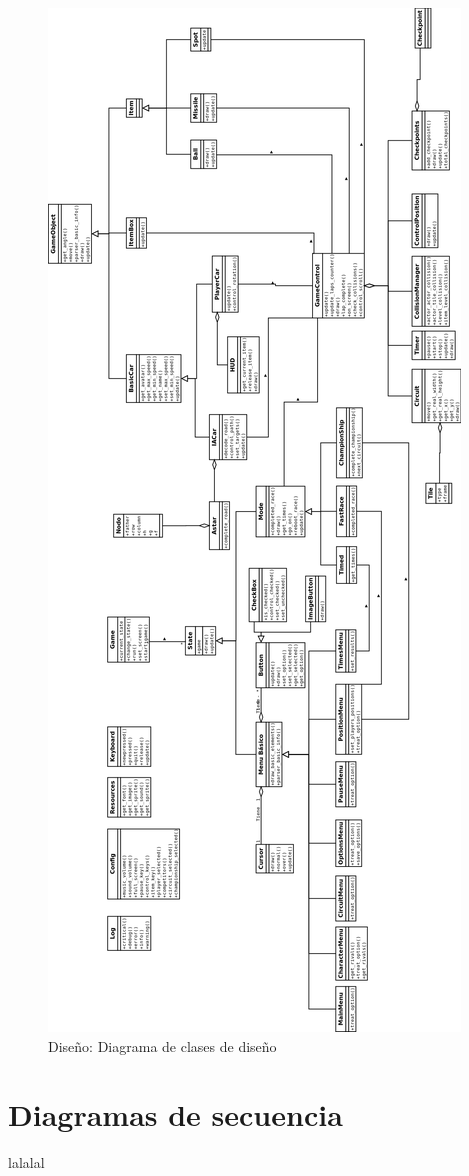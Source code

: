 \begin{figure}[H]
  \label{diagrama_clases_diseno}
  \begin{center}
    \includegraphics[scale=0.25]{imagenes/diagrama_clases_diseno.png}
  \end{center}
  \caption{Diseño: Diagrama de clases de diseño}
\end{figure}

\section{Diagramas de secuencia}
lalalal
